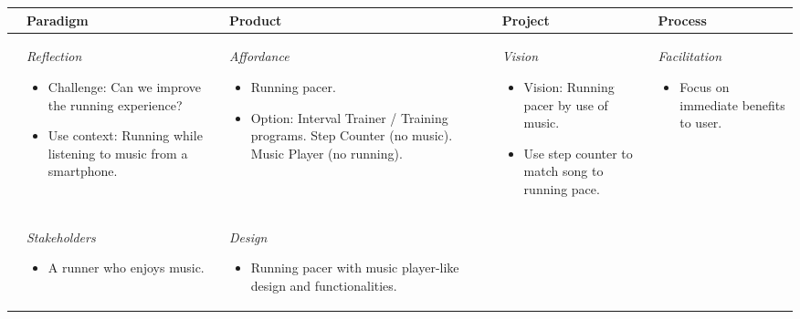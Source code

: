 \begin{table}
\scriptsize
\begin{tabular}{|l|l|l|l|l|} \hline
         & \textbf{Paradigm} & \textbf{Product} & \textbf{Project} & \textbf{Process} \\ \hline
\parbox[t][4cm][c]{0.02\textwidth}{} %
	& \parbox[t][][c]{0.20\textwidth}{ 
		\textit{Reflection}
		\begin{itemize}[leftmargin=*]
		\item Challenge: Can we improve the running experience?
		\item Use context: Running while listening to music from a smartphone.
		\end{itemize}
	}
	& \parbox[t][][c]{0.20\textwidth}{ 
		\textit{Affordance} 
		\begin{itemize}[leftmargin=*]
		\item Running pacer. 
		\item Option: 
			Interval Trainer / Training programs. \newline
			Step Counter (no music). \newline
			Music Player (no running). 
		\end{itemize}	 
	}
	& \parbox[t][][c]{0.20\textwidth}{  
		\textit{Vision} 
		\begin{itemize}[leftmargin=*]
		\item Vision: Running pacer by use of music. 
		\item Use step counter to match song to running pace.
		\end{itemize}
	}
    & \parbox[t][][c]{0.20\textwidth}{ 
	    \textit{Facilitation}
   		\begin{itemize}[leftmargin=*]
		\item Focus on immediate benefits to user.
		\end{itemize}
   } \\ \hline
\parbox[t][5cm][c]{0.02\textwidth}{}
	& \parbox[t][][c]{0.20\textwidth}{ 
	    \textit{Stakeholders} 
		\begin{itemize}[leftmargin=*]
		\item A runner who enjoys music.
		\end{itemize}
	}
	& \parbox[t][][c]{0.20\textwidth}{ 
		\textit{Design} 
		\begin{itemize}[leftmargin=*]
		\item Running pacer with music player-like design and functionalities.  
		\end{itemize}
}
\end{tabular}
\end{table}
